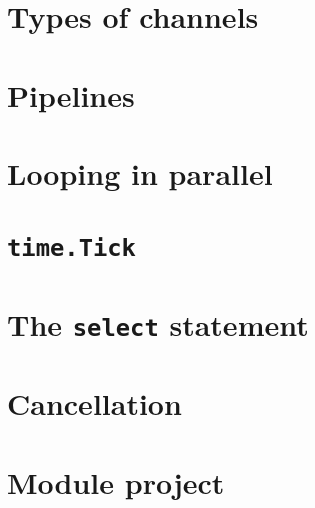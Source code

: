 \documentclass[]{book}
\begin{document}
\hypertarget{types-of-channels}{%
\section{Types of channels}\label{types-of-channels}}

\hypertarget{pipelines}{%
\section{Pipelines}\label{pipelines}}

\hypertarget{looping-in-parallel}{%
\section{Looping in parallel}\label{looping-in-parallel}}

\hypertarget{time.tick}{%
\section{\texorpdfstring{\texttt{time.Tick}}{time.Tick}}\label{time.tick}}

\hypertarget{the-select-statement}{%
\section{\texorpdfstring{The \texttt{select} statement}{The select statement}}\label{the-select-statement}}

\hypertarget{cancellation}{%
\section{Cancellation}\label{cancellation}}

\hypertarget{module-project-4}{%
\section*{Module project}\label{module-project-4}}
\end{document}
